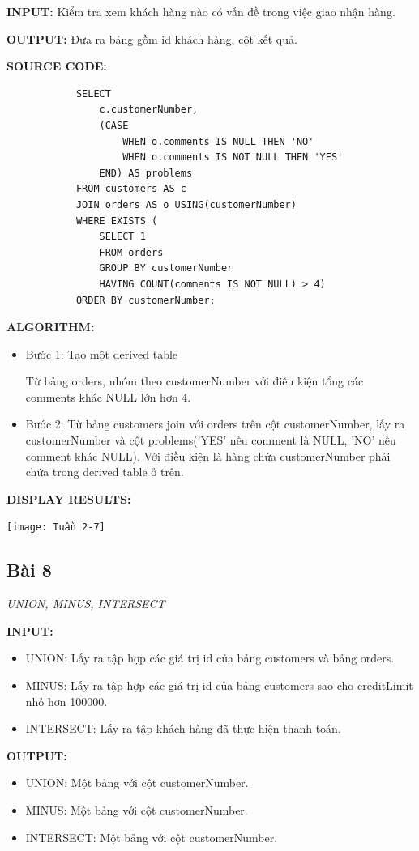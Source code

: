 \documentclass[12pt,a4paper]{report}
\begin{document}
	{\bf INPUT:} Kiểm tra xem khách hàng nào có vấn đề trong việc giao nhận hàng.
	
	{\bf OUTPUT:} Đưa ra bảng gồm id khách hàng, cột kết quả.
	
	{\bf SOURCE CODE:}
		\begin{lstlisting}
			SELECT
				c.customerNumber,
				(CASE
					WHEN o.comments IS NULL THEN 'NO'
					WHEN o.comments IS NOT NULL THEN 'YES'
				END) AS problems
			FROM customers AS c
			JOIN orders AS o USING(customerNumber)
			WHERE EXISTS (
				SELECT 1
				FROM orders
				GROUP BY customerNumber
				HAVING COUNT(comments IS NOT NULL) > 4)
			ORDER BY customerNumber;
		\end{lstlisting}
		
	{\bf ALGORITHM:}
		\begin{itemize}
		
			\item Bước 1: Tạo một derived table
					
					Từ bảng orders, nhóm theo customerNumber với điều kiện tổng các comments khác NULL lớn hơn 4.
			\item Bước 2: Từ bảng customers join với orders trên cột customerNumber, lấy ra customerNumber và cột problems('YES' nếu comment là NULL, 'NO' nếu comment khác NULL). Với điều kiện là hàng chứa customerNumber phải chứa trong derived table ở trên.
		\end{itemize}
	
	{\bf DISPLAY RESULTS:}
		\begin{center}
			\texttt{[image: Tuần 2-7]}
		\end{center}
\subsection{Bài 8}
	\begin{center}
		{\it UNION, MINUS, INTERSECT}
	\end{center}
	
	{\bf INPUT:}
		\begin{itemize}
			\item UNION: Lấy ra tập hợp các giá trị id của bảng customers và bảng orders.
			\item MINUS: Lấy ra tập hợp các giá trị id của bảng customers sao cho creditLimit nhỏ hơn 100000.
			\item INTERSECT: Lấy ra tập khách hàng đã thực hiện thanh toán.
		\end{itemize}
	
	{\bf OUTPUT:}
		\begin{itemize}
			\item UNION: Một bảng với cột customerNumber.
			\item MINUS: Một bảng với cột customerNumber.
			\item INTERSECT: Một bảng với cột customerNumber.
		\end{itemize}
	
\end{document}
